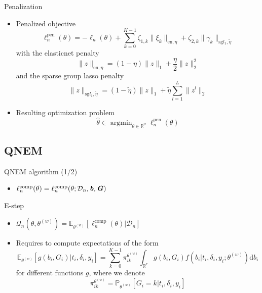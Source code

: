 \documentclass{beamer}
\DeclareMathOperator{\argmin}{argmin}
\newcommand{\dd}{\mathrm{d}}
\newcommand{\E}{\mathbb E}
\newcommand{\R}{\mathbb R}
\renewcommand{\P}{\mathds{P}}
\newcommand{\norm}[1]{\|#1\|}
\newcommand{\cD}{\mathcal D}
\newcommand{\cQ}{\mathcal Q}
\renewcommand{\P}{\mathds P}
\begin{document}
\begin{frame}{Penalization}

\small

\begin{itemize}
  \item<1-> Penalized objective
  \begin{equation*}
  \ell_n^\text{pen}(\theta) = - \ell_n(\theta) + \sum_{k=0}^{K-1} \zeta_{1,k} \norm{\xi_k}_{\text{en}, \eta} + \zeta_{2,k} \norm{\gamma_k}_{\text{sg} l_1, \tilde{\eta}}
  \end{equation*}
  with the elasticnet penalty \[ \norm{z}_{\text{en}, \eta} = (1-\eta)\norm{z}_1 + \dfrac\eta2 \norm{z}_2^2 \] and the sparse group lasso penalty \[ \norm{z}_{\text{sg} l_1, \tilde{\eta}} = (1-\tilde{\eta})\norm{z}_1 + \tilde{\eta} \sum_{l=1}^L\norm{z^l}_2 \]
  \item<2-> Resulting optimization problem \[\hat \theta \in \argmin_{\theta \in \R^\vartheta} \ell_n^\text{pen}(\theta)\]
\end{itemize}

\end{frame}

\subsection{QNEM}

\begin{frame}{QNEM algorithm (1/2)}

\small

\begin{itemize}
  \item<1-> $\ell_n^\text{comp}(\theta) = \ell_n^\text{comp}(\theta ; \cD_n, \textbf{\textit{b}}, \textbf{\textit{G}})$
\end{itemize}

\begin{block}{E-step}
\begin{itemize}
  \item<2-> $\cQ_n(\theta, \theta^{(w)}) = \E_{\theta^{(w)}}[\ell_n^\text{comp}(\theta) | \cD_n]$
  \item<3-> Requires to compute expectations of the form
  \footnotesize
\[ \E_{\theta^{(w)}}[ g(b_i, G_i) | t_i, \delta_i, y_i] = \sum_{k=0}^{K-1} \pi_{ik}^{\theta^{(w)}} \int_{\R^r} g(b_i, G_i) f(b_i | t_i, \delta_i, y_i ; \theta^{(w)}) \dd b_i \] 
\small for different functions $g$, where we denote 
\[\pi_{ik}^{\theta^{(w)}} = \P_{\theta^{(w)}}[G_i = k | t_i, \delta_i, y_i] \]
\end{itemize}
\end{block}


\end{frame}
\end{document}
